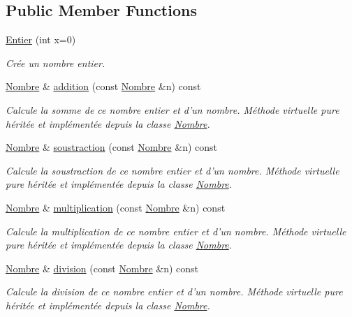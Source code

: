\subsection*{\-Public \-Member \-Functions}
\begin{DoxyCompactItemize}
\item 
\hyperlink{classEntier_a8eea484d9052df02d4ac9e03019863ec}{\-Entier} (int x=0)
\begin{DoxyCompactList}\small\item\em \-Crée un nombre entier. \end{DoxyCompactList}\item 
\hyperlink{classNombre}{\-Nombre} \& \hyperlink{classEntier_abbb59e17a481b81158182411a46faf82}{addition} (const \hyperlink{classNombre}{\-Nombre} \&n) const 
\begin{DoxyCompactList}\small\item\em \-Calcule la somme de ce nombre entier et d'un nombre. \-Méthode virtuelle pure héritée et implémentée depuis la classe \hyperlink{classNombre}{\-Nombre}. \end{DoxyCompactList}\item 
\hyperlink{classNombre}{\-Nombre} \& \hyperlink{classEntier_aad2b72821451bf5a0445f1cccc8ab1cb}{soustraction} (const \hyperlink{classNombre}{\-Nombre} \&n) const 
\begin{DoxyCompactList}\small\item\em \-Calcule la soustraction de ce nombre entier et d'un nombre. \-Méthode virtuelle pure héritée et implémentée depuis la classe \hyperlink{classNombre}{\-Nombre}. \end{DoxyCompactList}\item 
\hyperlink{classNombre}{\-Nombre} \& \hyperlink{classEntier_a4e51200ae8e5e704ecb349d2d69f0dbf}{multiplication} (const \hyperlink{classNombre}{\-Nombre} \&n) const 
\begin{DoxyCompactList}\small\item\em \-Calcule la multiplication de ce nombre entier et d'un nombre. \-Méthode virtuelle pure héritée et implémentée depuis la classe \hyperlink{classNombre}{\-Nombre}. \end{DoxyCompactList}\item 
\hyperlink{classNombre}{\-Nombre} \& \hyperlink{classEntier_a968f1bd92ad6fc703aa3160921d905f7}{division} (const \hyperlink{classNombre}{\-Nombre} \&n) const 
\begin{DoxyCompactList}\small\item\em \-Calcule la division de ce nombre entier et d'un nombre. \-Méthode virtuelle pure héritée et implémentée depuis la classe \hyperlink{classNombre}{\-Nombre}. \end{DoxyCompactList}\item 

\end{DoxyCompactItemize}
